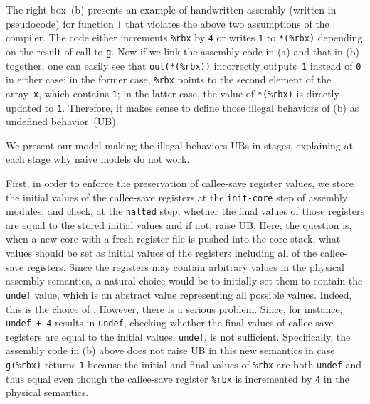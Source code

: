 The right box~(b) presents an example of handwritten assembly
(written in pseudocode) for function \texttt{f} that violates the
above two assumptions of the compiler. The code either increments
\texttt{\%rbx} by \texttt{4} or writes \texttt{1} to \texttt{*(\%rbx)}
depending on the result of call to \texttt{g}.  Now if we link the assembly
code in (a) and that in (b) together, one can easily see that
\texttt{out(*(\%rbx))} incorrectly outputs~\texttt{1} instead
of \texttt{0} in either case: in the former case, \texttt{\%rbx}
points to the second element of the array~\texttt{x}, which contains
\texttt{1}; in the latter case, the value of \texttt{*(\%rbx)} is
directly updated to \texttt{1}. Therefore, it makes sense to
define those illegal behaviors of (b) as undefined behavior~(UB).

\label{sec:compiler:solution:model}
%
We present our model making the illegal behaviors UBs
in stages, explaining at each stage why naive models do not work.

First, in order to enforce the preservation of callee-save register
values, we store the initial values of the callee-save registers at
the \texttt{init-core} step of assembly modules; and check, at the
\texttt{halted} step, whether the final values of those registers are
equal to the stored initial values and if not, raise UB.  Here, the
question is, when a new core with a fresh register file is pushed into the core stack,
what values should be set as initial values of the \nip{}
registers including all of the callee-save registers.  Since the
registers may contain arbitrary values in the physical assembly
semantics, a natural choice would be to initially set them to contain
the \texttt{undef} value, which is an abstract value representing all
possible values. Indeed, this is the choice of \ccc{}.  However, there
is a serious problem. Since, for instance, \texttt{undef + 4} results
in \texttt{undef}, checking whether the final values of callee-save
registers are equal to the initial values, \ie \texttt{undef}, is
not sufficient. Specifically, the assembly code in (b) above
does not raise UB in this new semantics in case \texttt{g(\%rbx)} returns \texttt{1}
because the initial and final values of \texttt{\%rbx}
are both \texttt{undef} and thus equal
even though the callee-save register \texttt{\%rbx} is incremented
by \texttt{4} in the physical semantics.

